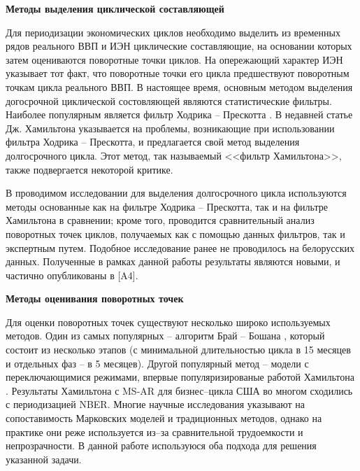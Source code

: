 \documentclass[a4paper,14pt]{extreport}
\begin{document}
	\bigskip
	\textbf{Методы выделения циклической составляющей}
	
	Для периодизации экономических циклов необходимо выделить из временных рядов реального ВВП и ИЭН циклические составляющие, на основании которых затем оцениваются поворотные точки циклов. На опережающий характер ИЭН указывает тот факт, что поворотные точки его цикла предшествуют поворотным точкам цикла реального ВВП. В настоящее время, основным методом выделения догосрочной циклической состовляющей являются статистические фильтры. Наиболее популярным является фильтр Ходрика -- Прескотта \cite{oecdCycleExtraction,estrellaFilterDo}.
	В недавней статье Дж. Хамильтона \cite{hamHP} указывается на проблемы, возникающие при использовании фильтра Ходрика -- Прескотта, и предлагается свой метод выделения долгосрочного цикла. Этот метод, так называемый <<фильтр Хамильтона>>, также подвергается некоторой критике.
	
	В проводимом исследовании для выделения долгосрочного цикла используются методы основанные как на фильтре Ходрика – Прескотта, так и на фильтре Хамильтона в сравнении; кроме того, проводится сравнительный анализ поворотных точек циклов, получаемых как с помощью данных фильтров, так и экспертным путем.
	Подобное исследование ранее не проводилось на белорусских данных. Полученные в рамках данной работы результаты являются новыми, и частично опубликованы в [A4].
	
	\bigskip
	\textbf{Методы оценивания поворотных точек}
	
	Для оценки поворотных точек существуют несколько широко используемых методов. Один из самых популярных -- алгоритм Брай -- Бошана \cite{bryCyclicalAnalysis}, который состоит из несколько этапов (с минимальной длительностью цикла в 15 месяцев и отдельных фаз -- в 5 месяцев). Другой популярный метод -- модели с переключающимися режимами, впервые популяризированые работой Хамильтона \cite{hamNewApproach}. Результаты Хамильтона с MS-AR для бизнес--цикла США во многом сходились с периодизацией NBER. Многие научные исследования \cite{bodmanCanada,brunoItaly,hardingTwoMethods} указывают на сопоставимость Марковских моделей и традиционных методов, однако на практике они реже используется из--за сравнительной трудоемкости и непрозрачности.
	В данной работе используюся оба подхода для решения указанной задачи.
	
\end{document}
